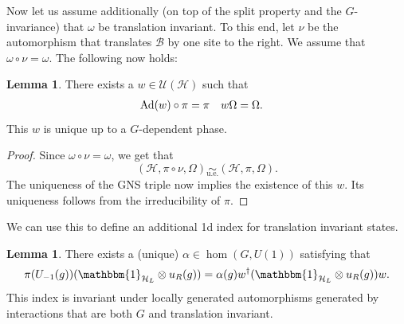 \documentclass[12pt,a4paper,twoside]{article}
\let\originalleft\left
\let\originalright\right
\renewcommand{\left}{\mathopen{}\mathclose\bgroup\originalleft}
\renewcommand{\right}{\aftergroup\egroup\originalright}
\newcommand{\UU}{\mathcal U}
\newcommand{\BB}{\mathcal B}
\newcommand{\HH}{\mathcal H}
\newcommand{\id}{\mathbbm{1}}
\newcommand{\Ad}[1]{\textrm{Ad}\left(#1\right)}
\newcommand{\ue}{\underset{\text{u.e.}}{\sim}}
\theoremstyle{definition}
\newtheorem{lemma}[theorem]{Lemma}
\numberwithin{equation}{section}
\begin{document}
Now let us assume additionally (on top of the split property and the $G$-invariance) that $\omega$ be translation invariant. To this end, let $\nu$ be the automorphism that translates $\BB$ by one site to the right. We assume that $\omega\circ\nu=\omega$. The following now holds:
\begin{lemma}
	There exists a $w\in\UU(\HH)$ such that
	\begin{align}
		\Ad{w}\circ\pi&=\pi&w\Omega&=\Omega.
	\end{align}
	This $w$ is unique up to a $G$-dependent phase.
\end{lemma}
\begin{proof}
	Since $\omega\circ\nu=\omega$, we get that
	\begin{equation}
		(\HH,\pi\circ\nu,\Omega)\ue (\HH,\pi,\Omega).
	\end{equation}
	The uniqueness of the GNS triple now implies the existence of this $w$. Its uniqueness follows from the irreducibility of $\pi$.
\end{proof}
We can use this to define an additional 1d index for translation invariant states.
\begin{lemma}
	There exists a (unique) $\alpha\in\hom(G,U(1))$ satisfying that
	\begin{equation}
		\pi(U_{-1}(g)) (\id_{\HH_L}\otimes u_R(g))=\alpha(g)w^\dagger(\id_{\HH_L}\otimes u_R(g)) w.
	\end{equation}
	This index is invariant under locally generated automorphisms generated by interactions that are both $G$ and translation invariant.
\end{lemma}
\end{document}
